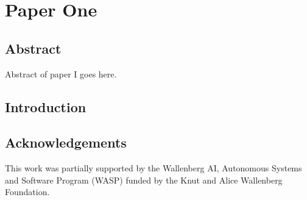 

\chapter[Paper One]{\texorpdfstring{%
Paper One}{%
Paper One}}

\paperRemark{\paperIref}




\section*{Abstract}
Abstract of paper I goes here.



\section{Introduction}
\label{sec:introduction}




\section*{Acknowledgements}

This work was partially supported by the Wallenberg AI, Autonomous Systems and Software Program (WASP) funded by the Knut and Alice Wallenberg Foundation.

{\raggedright
\printbibliography[segment=\therefsegment,heading=subbibliography]
}
